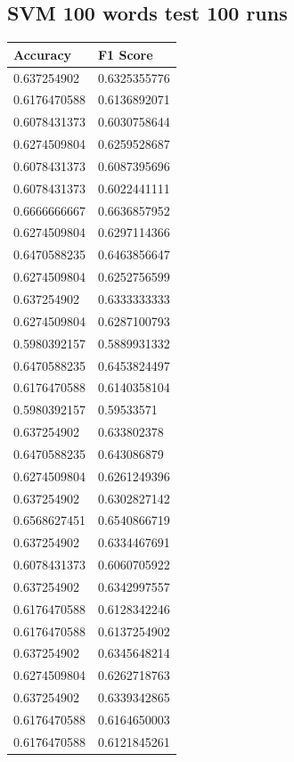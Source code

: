 \subsection{SVM 100 words test 100 runs}
	\begin{longtable}{@{}ll@{}}
		\toprule
		Accuracy     & F1 Score     \\ \midrule
		0.637254902  & 0.6325355776 \\
		0.6176470588 & 0.6136892071 \\
		0.6078431373 & 0.6030758644 \\
		0.6274509804 & 0.6259528687 \\
		0.6078431373 & 0.6087395696 \\
		0.6078431373 & 0.6022441111 \\
		0.6666666667 & 0.6636857952 \\
		0.6274509804 & 0.6297114366 \\
		0.6470588235 & 0.6463856647 \\
		0.6274509804 & 0.6252756599 \\
		0.637254902  & 0.6333333333 \\
		0.6274509804 & 0.6287100793 \\
		0.5980392157 & 0.5889931332 \\
		0.6470588235 & 0.6453824497 \\
		0.6176470588 & 0.6140358104 \\
		0.5980392157 & 0.59533571   \\
		0.637254902  & 0.633802378  \\
		0.6470588235 & 0.643086879  \\
		0.6274509804 & 0.6261249396 \\
		0.637254902  & 0.6302827142 \\
		0.6568627451 & 0.6540866719 \\
		0.637254902  & 0.6334467691 \\
		0.6078431373 & 0.6060705922 \\
		0.637254902  & 0.6342997557 \\
		0.6176470588 & 0.6128342246 \\
		0.6176470588 & 0.6137254902 \\
		0.637254902  & 0.6345648214 \\
		0.6274509804 & 0.6262718763 \\
		0.637254902  & 0.6339342865 \\
		0.6176470588 & 0.6164650003 \\
		0.6176470588 & 0.6121845261 \\

\end{longtable}
